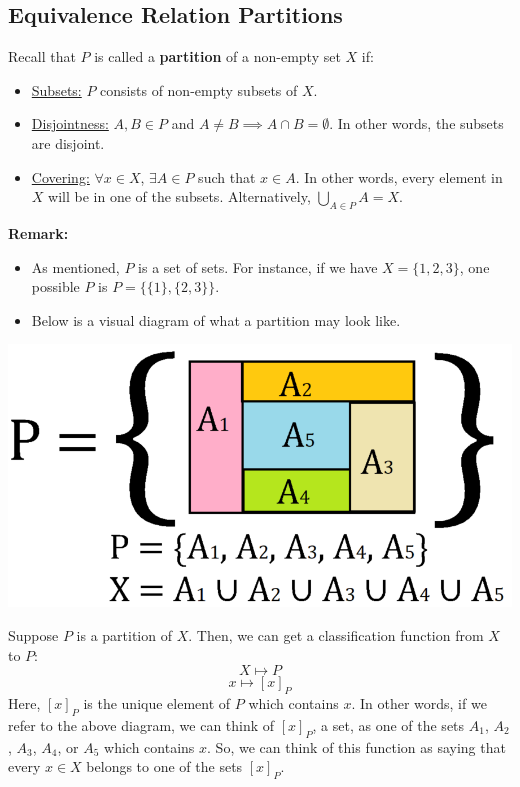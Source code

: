 \documentclass[letterpaper]{article}
\begin{document}
\subsection{Equivalence Relation Partitions}
Recall that $P$ is called a \textbf{partition} of a non-empty set $X$ if:
\begin{itemize}
    \item \underline{Subsets:} $P$ consists of non-empty subsets of $X$. 
    \item \underline{Disjointness:} $A, B \in P$ and $A \neq B \implies A \cap B = \emptyset$. In other words, the subsets are disjoint. 
    \item \underline{Covering:} $\forall x \in X$, $\exists A \in P$ such that $x \in A$. In other words, every element in $X$ will be in one of the subsets. Alternatively, $\bigcup_{A \in P} A = X$. 
\end{itemize}

\textbf{Remark:}
\begin{itemize}
    \item As mentioned, $P$ is a set of sets. For instance, if we have $X = \{1, 2, 3\}$, one possible $P$ is $P = \{\{1\}, \{2, 3\}\}$.
    \item Below is a visual diagram of what a partition may look like.
\end{itemize}
\begin{center}
    \includegraphics[scale=0.4]{assets/partition.PNG}
\end{center}

Suppose $P$ is a partition of $X$. Then, we can get a classification function from $X$ to $P$:
\[X \mapsto P\]
\[x \mapsto [x]_P\]
Here, $[x]_P$ is the unique element of $P$ which contains $x$. In other words, if we refer to the above diagram, we can think of $[x]_P$, a set, as one of the sets $A_1$, $A_2$, $A_3$, $A_4$, or $A_5$ which contains $x$. So, we can think of this function as saying that every $x \in X$ belongs to one of the sets $[x]_P$. 
\end{document}
